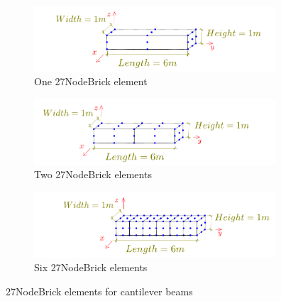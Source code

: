 \documentclass[fleqn,11pt,letter]{article}
\begin{document}
\begin{figure}[H]
  \centering
  \begin{subfigure}{0.5\textwidth}
    \centering
    \includegraphics[width=9cm]{../Figure_files/27NodeBrick/beam_27brick_1div.pdf}
    \caption{One 27NodeBrick element}
  \end{subfigure}
  \vskip 8pt
  \begin{subfigure}{0.5\textwidth}
    \centering
    \includegraphics[width=9cm]{../Figure_files/27NodeBrick/beam_27brick_2div.pdf}
    \caption{Two 27NodeBrick elements}
  \end{subfigure}
  \vskip 8pt
  \begin{subfigure}{0.5\textwidth}
    \centering
    \includegraphics[width=9cm]{../Figure_files/27NodeBrick/beam_27brick_6div.pdf}
    \caption{Six 27NodeBrick elements}
  \end{subfigure}
  \captionsetup{justification=centering,margin=3cm}
  \caption{27NodeBrick elements for cantilever beams}
  \label{fig 27NodeBrick elements for cantilever beams}
\end{figure}





\end{document}
